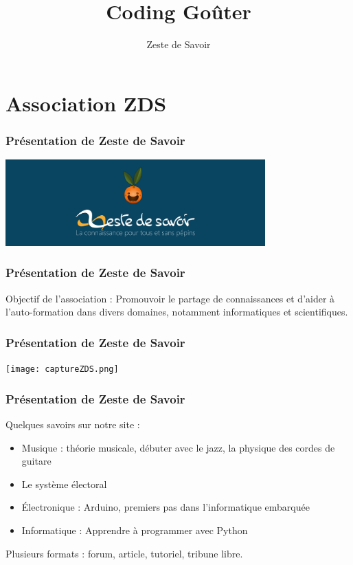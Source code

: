 \documentclass{beamer}
\title{Coding Goûter}
\author{Zeste de Savoir}
\begin{document}
\begin{frame}
  \titlepage
\end{frame}

\section{Association ZDS}

\begin{frame}
  \frametitle{Présentation de Zeste de Savoir}
  \begin{center}
        \includegraphics[width=10cm]{zds.png}
    \end{center}
\end{frame}

\begin{frame}
    \frametitle{Présentation de Zeste de Savoir}
    Objectif de l'association : Promouvoir le partage de connaissances et d’aider à l’auto-formation dans divers domaines, notamment informatiques et scientifiques.
\end{frame}

\begin{frame}
    \frametitle{Présentation de Zeste de Savoir}
    \begin{center}
        \texttt{[image: captureZDS.png]}
    \end{center}
\end{frame}

\begin{frame}
    \frametitle{Présentation de Zeste de Savoir}
    Quelques savoirs sur notre site :
    \begin{itemize}
        \item Musique : théorie musicale, débuter avec le jazz, la physique des cordes de guitare
        \item Le système électoral
        \item Électronique : Arduino, premiers pas dans l'informatique embarquée
        \item Informatique : Apprendre à programmer avec Python
    \end{itemize}
    Plusieurs formats : forum, article, tutoriel, tribune libre.
\end{frame}
\end{document}
